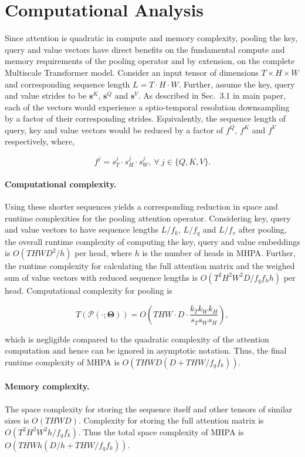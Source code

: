 \documentclass[10pt,twocolumn,letterpaper]{article}
\newcommand{\fullnameCC}{Multiscale Transformer\xspace}
\newcommand{\attnabbvspace}{MHPA\xspace}
\begin{document}
\section{Computational Analysis}
\label{sec:analysis}
Since attention is quadratic in compute and memory complexity, pooling the key, query and value vectors have direct benefits on the fundamental compute and memory requirements of the pooling operator and by extension, on the complete \fullnameCC model. Consider an input tensor of dimensions $T \times H \times W$ and  corresponding sequence length $L = T \cdot H \cdot W$. Further, assume the key, query and value strides to be $\mathbf{s}^K$, $\mathbf{s}^Q$ and $\mathbf{s}^V$. As described in 
Sec.~{\color{red}3.1} in main paper,
each of the vectors would experience a sptio-temporal resolution downsampling by a factor of their corresponding strides. Equivalently, the sequence length of query, key and value vectors would be reduced by a factor of $f^Q$, $f^K$ and $f^V$ respectively, where,

$$
f^j = s^j_T \cdot s^j_H \cdot s^j_W, \ \forall \ j \in \{Q,K,V\}.
$$
\vspace{-10pt}
\paragraph{Computational complexity.} Using these shorter sequences yields a corresponding reduction in space and runtime complexities for the pooling attention operator. Considering key, query and value vectors to have sequence lengths $L/f_k$, $L/f_q$ and $L/f_v$ after pooling, the overall runtime complexity of computing the key, query and value embeddings is $O(THWD^2/h)$ per head, where $h$ is the number of heads in \attnabbvspace. Further, the runtime complexity for calculating the full attention matrix and the weighed sum of value vectors with reduced sequence lengths is $O(T^2H^2W^2D/f_qf_hh)$ per head. Computational complexity for pooling is 

$$T(\mathcal{P}(\cdot ; \mathbf{\Theta})) =  O\left(THW \cdot D \cdot \frac{k_Tk_Wk_H}{s_Ts_Ws_H}\right),$$ 

which is negligible compared to the quadratic complexity of the attention computation and hence can be ignored in asymptotic notation. Thus, the final runtime complexity of \attnabbvspace is $O(THWD(D + THW/f_qf_k))$. 

\paragraph{Memory complexity.} The space complexity for storing the sequence itself and other tensors of similar sizes is  $O(THWD)$. Complexity for storing the full attention matrix is $O(T^2H^2W^2 h/f_qf_k)$. Thus the total space complexity of \attnabbvspace is $O(THWh (D/h + THW/f_qf_k))$. 
\end{document}
